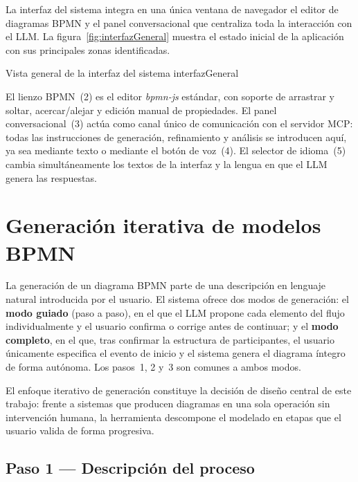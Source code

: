 La interfaz del sistema integra en una única ventana de navegador el editor de diagramas BPMN y el panel conversacional que centraliza toda la interacción con el LLM. La figura~\ref{fig:interfazGeneral} muestra el estado inicial de la aplicación con sus principales zonas identificadas.

%
  {Vista general de la interfaz del sistema}%
  {interfazGeneral}

El lienzo BPMN~(2) es el editor \textit{bpmn-js} estándar, con soporte de arrastrar y soltar, acercar/alejar y edición manual de propiedades. El panel conversacional~(3) actúa como canal único de comunicación con el servidor MCP: todas las instrucciones de generación, refinamiento y análisis se introducen aquí, ya sea mediante texto o mediante el botón de voz~(4). El selector de idioma~(5) cambia simultáneamente los textos de la interfaz y la lengua en que el LLM genera las respuestas.

\section{Generación iterativa de modelos BPMN}
\label{sec:demoGeneracion}

La generación de un diagrama BPMN parte de una descripción en lenguaje natural introducida por el usuario. El sistema ofrece dos modos de generación: el \textbf{modo guiado} (paso a paso), en el que el LLM propone cada elemento del flujo individualmente y el usuario confirma o corrige antes de continuar; y el \textbf{modo completo}, en el que, tras confirmar la estructura de participantes, el usuario únicamente especifica el evento de inicio y el sistema genera el diagrama íntegro de forma autónoma. Los pasos~1, 2 y~3 son comunes a ambos modos.

El enfoque iterativo de generación constituye la decisión de diseño central de este trabajo: frente a sistemas que producen diagramas en una sola operación sin intervención humana, la herramienta descompone el modelado en etapas que el usuario valida de forma progresiva.

\subsection{Paso 1 --- Descripción del proceso}
\label{subsec:demoDescripcion}

